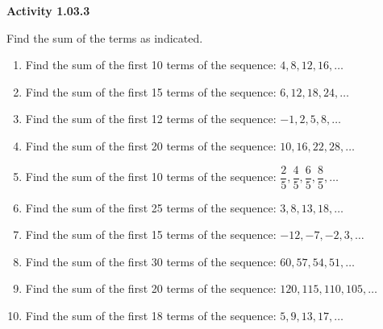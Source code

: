 \vspace{0.3ex}
\noindent\textbf{Activity 1.03.3}

\vspace{0.2ex}

Find the sum of the terms as indicated.
\begin{enumerate}
    \item Find the sum of the first 10 terms of the sequence: $4, 8, 12, 16, \dots$
    \item Find the sum of the first 15 terms of the sequence: $6, 12, 18, 24, \dots$
    \item Find the sum of the first 12 terms of the sequence: $-1, 2, 5, 8, \dots$
    \item Find the sum of the first 20 terms of the sequence: $10, 16, 22, 28, \dots$
    \item Find the sum of the first 10 terms of the sequence: $\dfrac{2}{5}, \dfrac{4}{5}, \dfrac{6}{5}, \dfrac{8}{5}, \dots$
    \item Find the sum of the first 25 terms of the sequence: $3, 8, 13, 18, \dots$
    \item Find the sum of the first 15 terms of the sequence: $-12, -7, -2, 3, \dots$
    \item Find the sum of the first 30 terms of the sequence: $60, 57, 54, 51, \dots$
    \item Find the sum of the first 20 terms of the sequence: $120, 115, 110, 105, \dots$
    \item Find the sum of the first 18 terms of the sequence: $5, 9, 13, 17, \dots$
\end{enumerate}